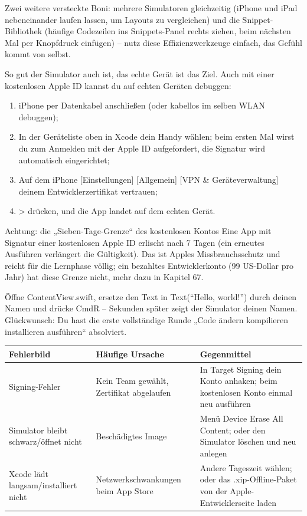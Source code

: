 Zwei weitere versteckte Boni: mehrere Simulatoren gleichzeitig (iPhone und iPad nebeneinander laufen lassen, um Layouts zu vergleichen) und die Snippet-Bibliothek (häufige Codezeilen ins Snippets-Panel rechts ziehen, beim nächsten Mal per Knopfdruck einfügen) – nutz diese Effizienzwerkzeuge einfach, das Gefühl kommt von selbst.


So gut der Simulator auch ist, das echte Gerät ist das Ziel. Auch mit einer kostenlosen Apple ID kannst du auf echten Geräten debuggen:

\begin{enumerate}
  \item iPhone per Datenkabel anschließen (oder kabellos im selben WLAN debuggen);
  \item In der Geräteliste oben in Xcode dein Handy wählen; beim ersten Mal wirst du zum Anmelden mit der Apple ID aufgefordert, die Signatur wird automatisch eingerichtet;
  \item Auf dem iPhone [Einstellungen] [Allgemein] [VPN \& Geräteverwaltung] deinem Entwicklerzertifikat vertrauen;
  \item > drücken, und die App landet auf dem echten Gerät.
\end{enumerate}

\begin{tcbwarn}{Achtung: die „Sieben-Tage-Grenze“ des kostenlosen Kontos}
Eine App mit Signatur einer kostenlosen Apple ID erlischt nach 7 Tagen (ein erneutes Ausführen verlängert die Gültigkeit). Das ist Apples Missbrauchsschutz und reicht für die Lernphase völlig; ein bezahltes Entwicklerkonto (99 US-Dollar pro Jahr) hat diese Grenze nicht, mehr dazu in Kapitel 67.

\end{tcbwarn}



Öffne ContentView.swift, ersetze den Text in Text(“Hello, world!”) durch deinen Namen und drücke CmdR – Sekunden später zeigt der Simulator deinen Namen. Glückwunsch: Du hast die erste vollständige Runde „Code ändern kompilieren installieren ausführen“ absolviert.

\begin{center}
\begin{tabularx}{\linewidth}{|X|X|X|}
\hline
\textbf{Fehlerbild} & \textbf{Häufige Ursache} & \textbf{Gegenmittel} \tabularnewline
\hline
Signing-Fehler & Kein Team gewählt, Zertifikat abgelaufen & In Target Signing dein Konto anhaken; beim kostenlosen Konto einmal neu ausführen \tabularnewline
Simulator bleibt schwarz/öffnet nicht & Beschädigtes Image & Menü Device Erase All Content; oder den Simulator löschen und neu anlegen \tabularnewline
Xcode lädt langsam/installiert nicht & Netzwerkschwankungen beim App Store & Andere Tageszeit wählen; oder das .xip-Offline-Paket von der Apple-Entwicklerseite laden \tabularnewline
\hline
\end{tabularx}
\end{center}


